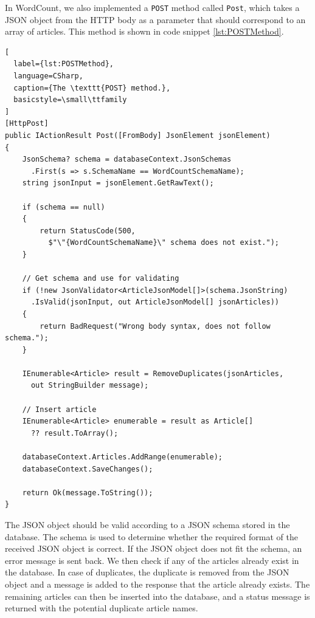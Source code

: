 In WordCount, we also implemented a \texttt{POST} method called \texttt{Post}, which takes a JSON object from the HTTP body as a parameter that should correspond to an array of articles. 
This method is shown in code snippet \ref{lst:POSTMethod}.

\begin{lstlisting}[
  label={lst:POSTMethod},
  language=CSharp, 
  caption={The \texttt{POST} method.}, 
  basicstyle=\small\ttfamily
]
[HttpPost]
public IActionResult Post([FromBody] JsonElement jsonElement)
{
    JsonSchema? schema = databaseContext.JsonSchemas
      .First(s => s.SchemaName == WordCountSchemaName);
    string jsonInput = jsonElement.GetRawText();

    if (schema == null)
    {
        return StatusCode(500, 
          $"\"{WordCountSchemaName}\" schema does not exist.");
    }

    // Get schema and use for validating
    if (!new JsonValidator<ArticleJsonModel[]>(schema.JsonString)
      .IsValid(jsonInput, out ArticleJsonModel[] jsonArticles))
    {
        return BadRequest("Wrong body syntax, does not follow schema.");
    }

    IEnumerable<Article> result = RemoveDuplicates(jsonArticles,
      out StringBuilder message);

    // Insert article
    IEnumerable<Article> enumerable = result as Article[] 
      ?? result.ToArray();

    databaseContext.Articles.AddRange(enumerable);
    databaseContext.SaveChanges();

    return Ok(message.ToString());
}
\end{lstlisting}

The JSON object should be valid according to a JSON schema stored in the database. The schema is used to determine whether the required format of the received JSON object is correct. If the JSON object does not fit the schema, an error message is sent back. 
We then check if any of the articles already exist in the database.
In case of duplicates, the duplicate is removed from the JSON object and a message is added to the response that the article already exists. 
The remaining articles can then be inserted into the database, and a status message is returned with the potential duplicate article names. 
 
